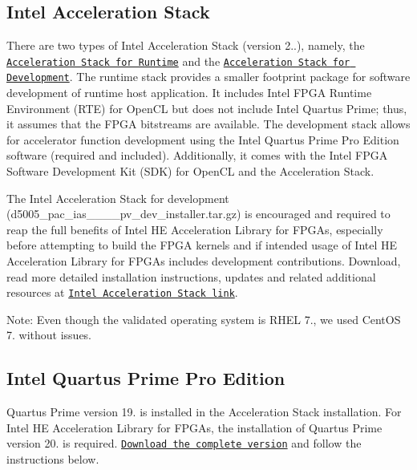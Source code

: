 \subsection*{Intel Acceleration Stack}

There are two types of Intel Acceleration Stack (version 2..), namely, the \href{https://www.intel.com/content/www/us/en/programmable/f/download/accelerator/license-agreement-pac-d5005.html?swcode=WWW-SWD-IAS-RTE-201}{\tt Acceleration Stack for Runtime} and the \href{https://www.intel.com/content/altera-www/global/en_us/index/f/download/accelerator/pac-d5005-thank-you.html?swcode=WWW-SWD-IAS-DEV-201}{\tt Acceleration Stack for Development}. The runtime stack provides a smaller footprint package for software development of runtime host application. It includes Intel F\-P\-G\-A Runtime Environment (R\-T\-E) for Open\-C\-L but does not include Intel Quartus Prime; thus, it assumes that the F\-P\-G\-A bitstreams are available. The development stack allows for accelerator function development using the Intel Quartus Prime Pro Edition software (required and included). Additionally, it comes with the Intel F\-P\-G\-A Software Development Kit (S\-D\-K) for Open\-C\-L and the Acceleration Stack. \par


The Intel Acceleration Stack for development ({\ttfamily d5005\-\_\-pac\-\_\-ias\-\_\-\_\-\_\-\_\-pv\-\_\-dev\-\_\-installer.\-tar.\-gz}) is encouraged and required to reap the full benefits of Intel H\-E Acceleration Library for F\-P\-G\-As, especially before attempting to build the F\-P\-G\-A kernels and if intended usage of Intel H\-E Acceleration Library for F\-P\-G\-As includes development contributions. Download, read more detailed installation instructions, updates and related additional resources at \href{https://www.intel.com/content/www/us/en/programmable/products/boards_and_kits/dev-kits/altera/intel-fpga-pac-d5005/getting-started.html}{\tt Intel Acceleration Stack link}. \par


Note\-: Even though the validated operating system is R\-H\-E\-L 7., we used Cent\-O\-S 7. without issues.\par


\subsection*{Intel Quartus Prime Pro Edition}

Quartus Prime version 19. is installed in the Acceleration Stack installation. For Intel H\-E Acceleration Library for F\-P\-G\-As, the installation of Quartus Prime version 20. is required. \href{https://fpgasoftware.intel.com/20.3/?edition=pro}{\tt Download the complete version} and follow the instructions below. \par


